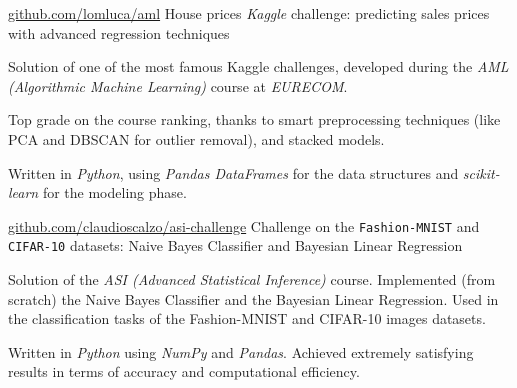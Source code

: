 \begin{cventries}
	\cvproj
		{\href{https://github.com/lomluca/aml}{github.com/lomluca/aml}}
		{House prices \textit{Kaggle} challenge: predicting sales prices with advanced regression techniques}
		{}
		{}
		{
			\begin{cvitems} %
				\item {Solution of one of the most famous Kaggle challenges, developed during the \textit{AML (Algorithmic Machine Learning)} course at \textit{EURECOM}.}
				\item {Top grade on the course ranking, thanks to smart preprocessing techniques (like PCA and DBSCAN for outlier removal), and stacked models.}
				\item {Written in \textit{Python}, using \textit{Pandas DataFrames} for the data structures and \textit{scikit-learn} for the modeling phase.}
			\end{cvitems}
		}
	
	\cvproj
		{\href{https://github.com/claudioscalzo/asi-challenge}{github.com/claudioscalzo/asi-challenge}}
		{Challenge on the \texttt{Fashion-MNIST} and \texttt{CIFAR-10} datasets: Naive Bayes Classifier and Bayesian Linear Regression}
		{}
		{}
		{
			\begin{cvitems} %
				\item {Solution of the \textit{ASI (Advanced Statistical Inference)} course. Implemented (from scratch) the Naive Bayes Classifier and the Bayesian Linear Regression. Used in the classification tasks of the Fashion-MNIST and CIFAR-10 images datasets.}
				\item {Written in \textit{Python} using \textit{NumPy} and \textit{Pandas}. Achieved extremely satisfying results in terms of accuracy and computational efficiency.}
			\end{cvitems}
		}
\end{cventries}
